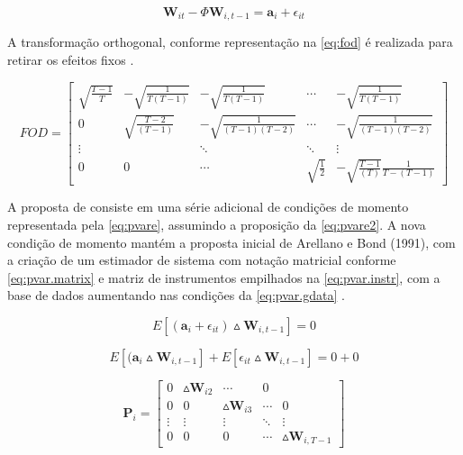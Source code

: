 \documentclass[
  12pt,
  12pt,
  openright,
  oneside,
  a4paper,
  chapter=TITLE,
  section=TITLE,
  subsection=TITLE,
  subsubsection=TITLE,
  english,
  portugues,
  sumario=tradicional]{abntex2}
\begin{document}
\begin{equation}\label{eq:pvarsys}
\mathbf{W}_{it} - \Phi\mathbf{W}_{i, t-1} = \mathbf{a}_{i} + \epsilon_{it}  
\end{equation}

A transformação orthogonal, conforme representação na \autoref{eq:fod} é realizada para retirar os efeitos fixos \cite{sigmund:2008}.

\begin{equation}\label{eq:fod}
FOD = \left[ \begin{array}{ccccc}
\sqrt{\frac{T-1}{T}}  & - \sqrt{\frac{1}{T(T - 1)}} & - \sqrt{\frac{1}{T(T - 1)}} & \cdots & - \sqrt{\frac{1}{T(T - 1)}}  \\
0 & \sqrt{\frac{T - 2 }{(T - 1)}} & - \sqrt{\frac{1}{(T - 1)(T - 2 )}} & \cdots &  - \sqrt{\frac{1}{(T - 1)(T - 2 )}} \\
\vdots & & \ddots & \ddots & \vdots \\
0 & 0 & \cdots & \sqrt{\frac{1}{2}} & - \sqrt{\frac{T - 1}{(T)}}\frac{1}{T-(T-1)}
\end{array}\right]
\end{equation}

A proposta de \textcite{blundelbond:1998} consiste em uma série adicional de condições de momento representada pela \autoref{eq:pvare}, assumindo a proposição da \autoref{eq:pvare2}. A nova condição de momento mantém a proposta inicial de Arellano e Bond (1991), com a criação de um estimador de sistema com notação matricial conforme \autoref{eq:pvar.matrix} e matriz de instrumentos empilhados na \autoref{eq:pvar.instr}, com a base de dados aumentando nas condições da \autoref{eq:pvar.gdata} \cite{sigmund:2008}.

\begin{equation}\label{eq:pvare}
E[(\mathbf{a}_{i} + \epsilon_{it}) \vartriangle\mathbf{W}_{i, t-1}] = 0
\end{equation}

\begin{equation}\label{eq:pvare2}
E[(\mathbf{a}_{i} \vartriangle\mathbf{W}_{i, t-1}]  +  E[\epsilon_{it}\vartriangle\mathbf{W}_{i, t-1}] = 0 + 0
\end{equation}

\begin{equation}\label{eq:pvar.matrix}
\mathbf{P}_{i} = \left[\begin{array}{ccccc}
0 & \vartriangle\mathbf{W}_{i2} & \cdots & 0 \\
0 & 0 &  \vartriangle\mathbf{W}_{i3} & \cdots & 0 \\
\vdots & \vdots & \vdots & \ddots & \vdots \\
0 & 0 & 0 & \cdots & \vartriangle\mathbf{W}_{i, T-1}
\end{array}\right]
\end{equation}
\end{document}
